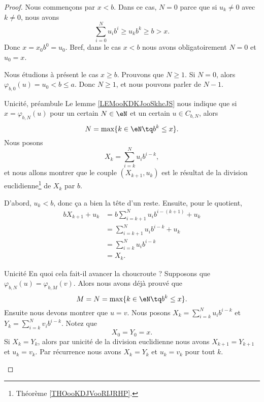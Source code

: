 \begin{proof}
    Nous commençons par \( x<b\). Dans ce cas, \( N=0\) parce que si \( u_k\neq 0\) avec \( k\neq 0\), nous avons
    \begin{equation}
        \sum_{i=0}^Nu_ib^i\geq u_kb^k\geq b>x.
    \end{equation}
    Donc \( x=x_0b^0=u_0\). Bref, dans le cas \( x<b\) nous avons obligatoirement \( N=0\) et \( u_0=x\).

    Nous étudions à présent le cas \( x\geq b\). Prouvons que \( N\geq 1\). Si \( N=0\), alors \( \varphi_{b,0}(u)=u_0<b\leq a\). Donc \( N\geq 1\), et nous pouvons parler de \( N-1\).

    \begin{subproof}
    \item[Unicité, préambule]
        Le lemme \ref{LEMooKDKJooSkhcJS} nous indique que si \( x=\varphi_{b,N}(u)\) pour un certain \( N\in \eN\) et un certain \( u\in C_{b,N}\), alors
        \begin{equation}
            N=\max\{ k\in \eN\tq b^k\leq x \}.
        \end{equation}
        Nous posons
        \begin{equation}
            X_k=\sum_{i=k}^Nu_ib^{i-k},
        \end{equation}
        et nous allons montrer que le couple \( (X_{k+1}, u_k)\) est le résultat de la division euclidienne\footnote{Théorème \ref{THOooKDJVooRIJRHP}.} de \( X_k\) par \(b\).

        D'abord, \( u_k<b\), donc ça a bien la tête d'un reste. Ensuite, pour le quotient, 
        \begin{subequations}
            \begin{align}
                bX_{k+1}+u_k&=b\sum_{i=k+1}^Nu_ib^{i-(k+1)}+u_k\\
                &=\sum_{i=k+1}^Nu_ib^{i-k}+u_k\\
                &=\sum_{i=k}^Nu_ib^{i-k}\\
                &=X_k.
            \end{align}
        \end{subequations}
    \item[Unicité]
        En quoi cela fait-il avancer la choucroute ? Supposons que \( \varphi_{b,N}(u)=\varphi_{b,M}(v)\). Alors nous avons déjà prouvé que
        \begin{equation}
            M=N=\max\{ k\in \eN\tq b^k\leq x \}.
        \end{equation}
        Ensuite nous devons montrer que \( u=v\). Nous posons \( X_k=\sum_{i=k}^Nu_ib^{i-k}\) et \( Y_k=\sum_{i=k}^Nv_ib^{i-k}\). Notez que
        \begin{equation}
            X_0=Y_0=x.
        \end{equation}
        Si \( X_k=Y_k\), alors par unicité de la division euclidienne nous avons \( X_{k+1}=Y_{k+1}\) et \( u_k=v_k\). Par récurrence nous avons \( X_k=Y_k\) et \( u_k=v_k\) pour tout \( k\).


\end{subproof}
\end{proof}
